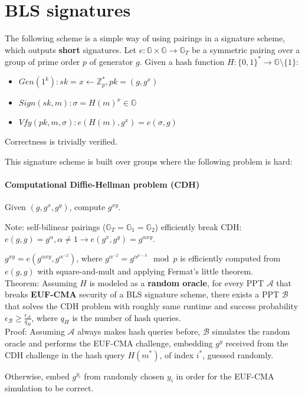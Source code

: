 \documentclass[oneside]{book}
\newcommand{\Z}[0]{\mathbb{Z}}
\newcommand{\G}[0]{\mathbb{G}}
\newcommand{\cA}[0]{\mathcal{A}}
\newcommand{\cB}[0]{\mathcal{B}}
\newcommand{\epsA}[0]{\epsilon_\cA}
\newcommand{\epsB}[0]{\epsilon_\cB}
\begin{document}
\section{BLS signatures}
The following scheme is a simple way of using pairings in a signature scheme, which outputs \textbf{short} signatures.
Let $e: \G \times \G \rightarrow \G_T$ be a symmetric pairing over a group of prime order $p$ of generator $g$.
Given a hash function $H: \{0,1\}^* \rightarrow \G \setminus \{1\}$:
\begin{itemize}
    \item $Gen(1^k): sk = x \leftarrow \Z^*_p, pk = (g, g^x)$
    \item $Sign(sk, m): \sigma = H(m)^x \in \G$
    \item $Vfy(pk, m, \sigma): e(H(m), g^x) = e(\sigma, g)$
\end{itemize}

Correctness is trivially verified.

This signature scheme is built over groups where the following problem is hard:

\paragraph{Computational Diffie-Hellman problem (CDH)}
Given $(g, g^x, g^y)$, compute $g^{xy}$.

Note: self-bilinear pairings ($\G_T = \G_1 = \G_2$) efficiently break CDH: $e(g,g) = g^{\alpha}, \alpha \neq 1 \rightarrow e(g^x,g^y) = g^{\alpha xy}$.

$g^{xy} = e(g^{\alpha xy}, g^{\alpha^{-2}})$, where $g^{\alpha^{-2}} = g^{\alpha^{p-3}} \mod p$ is efficiently computed from $e(g,g)$ with square-and-mult and applying Fermat's little theorem.\\

Theorem: Assuming $H$ is modeled as a \textbf{random oracle}, for every PPT $\cA$ that breaks \textbf{EUF-CMA} security of a BLS signature scheme, there exists a PPT $\cB$ that solves the CDH problem with roughly same runtime and success probability $\epsB \ge \frac{\epsA}{q_H}$, where $q_H$ is the number of hash queries.\\

Proof: Assuming $\cA$ always makes hash queries before, $\cB$ simulates the random oracle and performs the EUF-CMA challenge, embedding $g^y$ received from the CDH challenge in the hash query $H(m^*)$, of index $i^*$, guessed randomly.

Otherwise, embed $g^{y_i}$ from randomly chosen $y_i$ in order for the EUF-CMA simulation to be correct.\\
\end{document}
